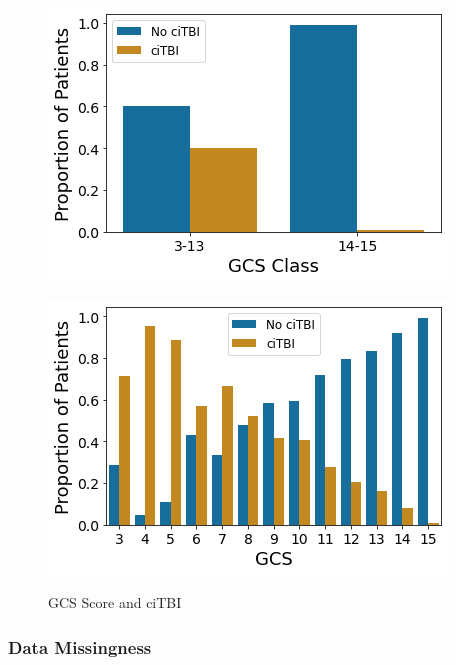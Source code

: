 \documentclass[11pt, letterpaper]{amsart}
\let\Oldsubsubsection\subsubsection
\renewcommand{\subsubsection}{\FloatBarrier\Oldsubsubsection}
\begin{document}
\begin{figure}
	\begin{minipage}[b]{0.5\linewidth}
		\centering
		\includegraphics[width=\textwidth]{GCSClass_prop.png}
		\label{fig:GCSClass}
	\end{minipage}%
	\begin{minipage}[b]{0.5\linewidth}
		\centering
		\includegraphics[width=\textwidth]{GCSTotal_prop.png}
		\label{fig:GCSTotal}
	\end{minipage}
	\caption{GCS Score and ciTBI}\label{fig:GCS}
\end{figure}


\subsubsection{Data Missingness}
\end{document}
